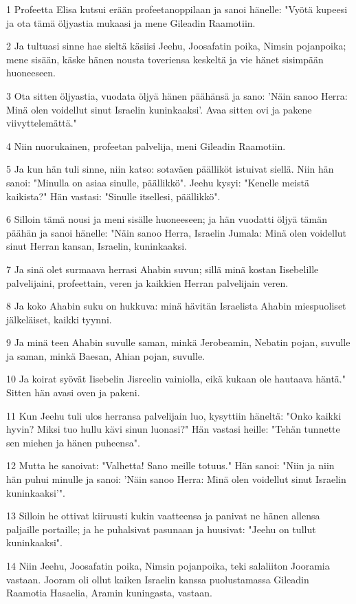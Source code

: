 \par 1 Profeetta Elisa kutsui erään profeetanoppilaan ja sanoi hänelle: "Vyötä kupeesi ja ota tämä öljyastia mukaasi ja mene Gileadin Raamotiin.
\par 2 Ja tultuasi sinne hae sieltä käsiisi Jeehu, Joosafatin poika, Nimsin pojanpoika; mene sisään, käske hänen nousta toveriensa keskeltä ja vie hänet sisimpään huoneeseen.
\par 3 Ota sitten öljyastia, vuodata öljyä hänen päähänsä ja sano: 'Näin sanoo Herra: Minä olen voidellut sinut Israelin kuninkaaksi'. Avaa sitten ovi ja pakene viivyttelemättä."
\par 4 Niin nuorukainen, profeetan palvelija, meni Gileadin Raamotiin.
\par 5 Ja kun hän tuli sinne, niin katso: sotaväen päälliköt istuivat siellä. Niin hän sanoi: "Minulla on asiaa sinulle, päällikkö". Jeehu kysyi: "Kenelle meistä kaikista?" Hän vastasi: "Sinulle itsellesi, päällikkö".
\par 6 Silloin tämä nousi ja meni sisälle huoneeseen; ja hän vuodatti öljyä tämän päähän ja sanoi hänelle: "Näin sanoo Herra, Israelin Jumala: Minä olen voidellut sinut Herran kansan, Israelin, kuninkaaksi.
\par 7 Ja sinä olet surmaava herrasi Ahabin suvun; sillä minä kostan Iisebelille palvelijaini, profeettain, veren ja kaikkien Herran palvelijain veren.
\par 8 Ja koko Ahabin suku on hukkuva: minä hävitän Israelista Ahabin miespuoliset jälkeläiset, kaikki tyynni.
\par 9 Ja minä teen Ahabin suvulle saman, minkä Jerobeamin, Nebatin pojan, suvulle ja saman, minkä Baesan, Ahian pojan, suvulle.
\par 10 Ja koirat syövät Iisebelin Jisreelin vainiolla, eikä kukaan ole hautaava häntä." Sitten hän avasi oven ja pakeni.
\par 11 Kun Jeehu tuli ulos herransa palvelijain luo, kysyttiin häneltä: "Onko kaikki hyvin? Miksi tuo hullu kävi sinun luonasi?" Hän vastasi heille: "Tehän tunnette sen miehen ja hänen puheensa".
\par 12 Mutta he sanoivat: "Valhetta! Sano meille totuus." Hän sanoi: "Niin ja niin hän puhui minulle ja sanoi: 'Näin sanoo Herra: Minä olen voidellut sinut Israelin kuninkaaksi'".
\par 13 Silloin he ottivat kiiruusti kukin vaatteensa ja panivat ne hänen allensa paljaille portaille; ja he puhalsivat pasunaan ja huusivat: "Jeehu on tullut kuninkaaksi".
\par 14 Niin Jeehu, Joosafatin poika, Nimsin pojanpoika, teki salaliiton Jooramia vastaan. Jooram oli ollut kaiken Israelin kanssa puolustamassa Gileadin Raamotia Hasaelia, Aramin kuningasta, vastaan.
